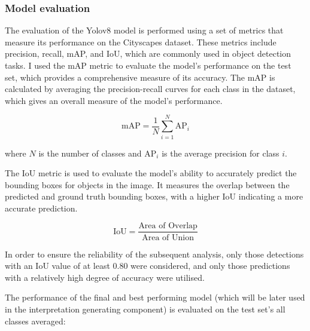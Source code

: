 \subsubsection{Model evaluation}\label{subsubsec:model-evaluation}
The evaluation of the Yolov8 model is performed using a set of metrics that measure its performance on the Cityscapes dataset.
These metrics include precision, recall, mAP, and IoU, which are commonly used in object detection tasks.
I used the mAP metric to evaluate the model's performance on the test set, which provides a comprehensive measure of its accuracy.
The mAP is calculated by averaging the precision-recall curves for each class in the dataset, which gives an overall measure of the model's performance.

\begin{equation}
\text{mAP} = \frac{1}{N} \sum_{i=1}^{N} \text{AP}_i
\end{equation}


where \( N \) is the number of classes and \( \text{AP}_i \) is the average precision for class \( i \).

The IoU metric is used to evaluate the model's ability to accurately predict the bounding boxes for objects in the image.
It measures the overlap between the predicted and ground truth bounding boxes, with a higher IoU indicating a more accurate prediction.

\begin{equation}
\text{IoU} = \frac{\text{Area of Overlap}}{\text{Area of Union}}
\end{equation}


In order to ensure the reliability of the subsequent analysis, only those detections with an IoU value of at least 0.80 were considered,
and only those predictions with a relatively high degree of accuracy were utilised.

The performance of the final and best performing model (which will be later used in the interpretation generating component) is evaluated on the test set's all classes averaged:


